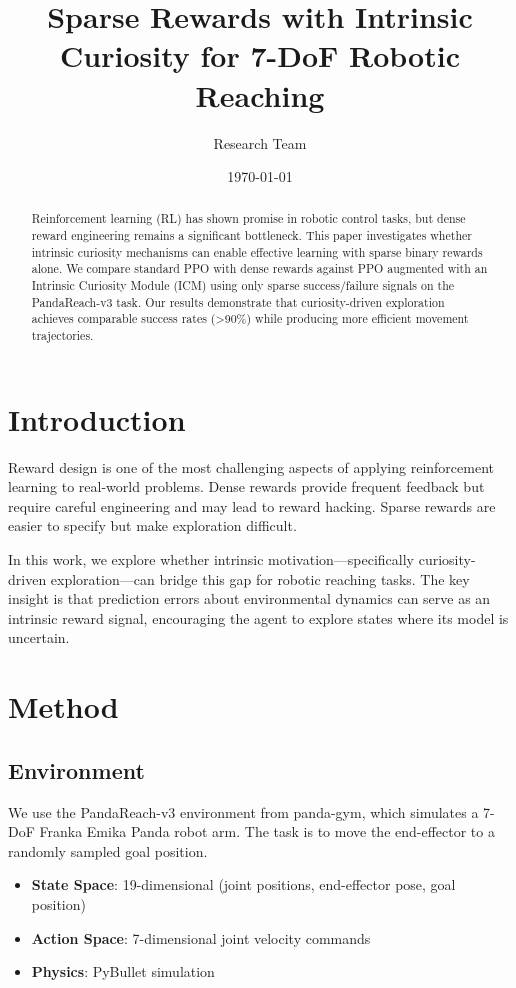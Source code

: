 \documentclass{article}
\title{Sparse Rewards with Intrinsic Curiosity for 7-DoF Robotic Reaching}
\author{Research Team}
\date{\today}
\begin{document}
\maketitle

\begin{abstract}
Reinforcement learning (RL) has shown promise in robotic control tasks, but dense reward engineering remains a significant bottleneck. This paper investigates whether intrinsic curiosity mechanisms can enable effective learning with sparse binary rewards alone. We compare standard PPO with dense rewards against PPO augmented with an Intrinsic Curiosity Module (ICM) using only sparse success/failure signals on the PandaReach-v3 task. Our results demonstrate that curiosity-driven exploration achieves comparable success rates (>90\%) while producing more efficient movement trajectories.
\end{abstract}

\section{Introduction}

Reward design is one of the most challenging aspects of applying reinforcement learning to real-world problems. Dense rewards provide frequent feedback but require careful engineering and may lead to reward hacking. Sparse rewards are easier to specify but make exploration difficult.

In this work, we explore whether intrinsic motivation---specifically curiosity-driven exploration---can bridge this gap for robotic reaching tasks. The key insight is that prediction errors about environmental dynamics can serve as an intrinsic reward signal, encouraging the agent to explore states where its model is uncertain.

\section{Method}

\subsection{Environment}

We use the PandaReach-v3 environment from panda-gym, which simulates a 7-DoF Franka Emika Panda robot arm. The task is to move the end-effector to a randomly sampled goal position.

\begin{itemize}
    \item \textbf{State Space}: 19-dimensional (joint positions, end-effector pose, goal position)
    \item \textbf{Action Space}: 7-dimensional joint velocity commands
    \item \textbf{Physics}: PyBullet simulation
\end{itemize}
\end{document}
